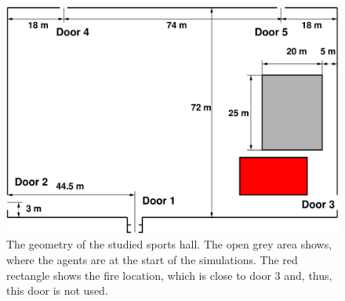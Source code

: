 \documentclass[12pt,a4paper,final,twoside]{stylevk}
\begin{document}
%
\begin{figure}[!b]
  \centerline{\includegraphics[clip=true,
  width=120mm]{FIGURES/SportHallGeom}} 
  \caption{The geometry of the studied sports hall.  The open grey
    area shows, where the agents are at the start of the simulations.
    The red rectangle shows the fire location, which is close to door
    3 and, thus, this door is not used.}\label{Fig_SportGeom}
\end{figure}
%
\end{document}
